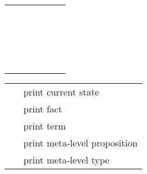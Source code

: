 \begin{isabellebody}
\begin{isamarkuptext}
\begin{tabular}{rcl}
      \hyperlink{command.fix}{\mbox{\isa{\isacommand{fix}}}}~\isa{x}~\hyperlink{command.assume}{\mbox{\isa{\isacommand{assume}}}}~\isa{{\isachardoublequote}a{\isacharcolon}\ x\ {\isasymequiv}\ t{\isachardoublequote}} \\
    \hyperlink{command.obtain}{\mbox{\isa{\isacommand{obtain}}}}~\isa{{\isachardoublequote}x\ {\isasymWHERE}\ a{\isacharcolon}\ {\isasymphi}{\isachardoublequote}} & \isa{{\isachardoublequote}{\isasymapprox}{\isachardoublequote}} &
      \isa{{\isachardoublequote}{\isasymdots}{\isachardoublequote}}~\hyperlink{command.fix}{\mbox{\isa{\isacommand{fix}}}}~\isa{x}~\hyperlink{command.assume}{\mbox{\isa{\isacommand{assume}}}}~\isa{{\isachardoublequote}a{\isacharcolon}\ {\isasymphi}{\isachardoublequote}} \\
    \hyperlink{command.case}{\mbox{\isa{\isacommand{case}}}}~\isa{c} & \isa{{\isachardoublequote}{\isasymapprox}{\isachardoublequote}} &
      \hyperlink{command.fix}{\mbox{\isa{\isacommand{fix}}}}~\isa{x}~\hyperlink{command.assume}{\mbox{\isa{\isacommand{assume}}}}~\isa{{\isachardoublequote}c{\isacharcolon}\ {\isasymphi}{\isachardoublequote}} \\
    \hyperlink{command.sorry}{\mbox{\isa{\isacommand{sorry}}}} & \isa{{\isachardoublequote}{\isasymapprox}{\isachardoublequote}} &
      \hyperlink{command.by}{\mbox{\isa{\isacommand{by}}}}~\isa{cheating} \\
  \end{tabular}%
\end{isamarkuptext}%
\isamarkuptrue%
%
\isamarkuptrue%
%
\begin{isamarkuptext}%
\begin{tabular}{ll}
    \hyperlink{command.pr}{\mbox{\isa{\isacommand{pr}}}} & print current state \\
    \hyperlink{command.thm}{\mbox{\isa{\isacommand{thm}}}}~\isa{a} & print fact \\
    \hyperlink{command.term}{\mbox{\isa{\isacommand{term}}}}~\isa{t} & print term \\
    \hyperlink{command.prop}{\mbox{\isa{\isacommand{prop}}}}~\isa{{\isasymphi}} & print meta-level proposition \\
    \hyperlink{command.typ}{\mbox{\isa{\isacommand{typ}}}}~\isa{{\isasymtau}} & print meta-level type \\
  \end{tabular}%
\end{isamarkuptext}%
\isamarkuptrue%
%
\end{isabellebody}
